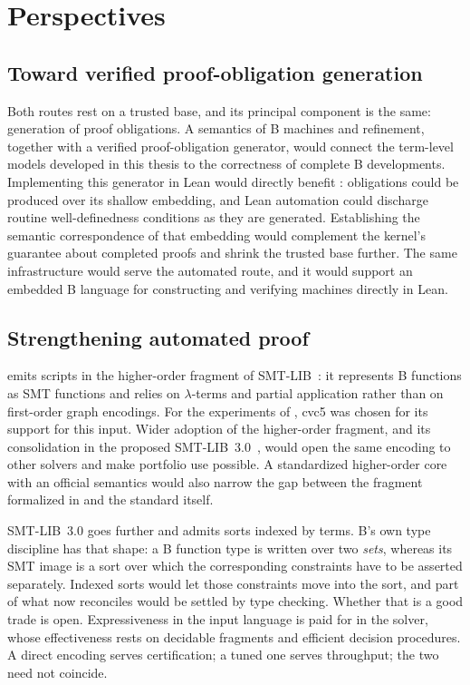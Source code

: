 \section{Perspectives}
\label{sec:future-work}

\subsection{Toward verified proof-obligation generation}

Both routes rest on a trusted base, and its principal component is the same: generation of proof obligations.
A semantics of B machines and refinement, together with a verified
proof-obligation generator, would connect the term-level models developed in
this thesis to the correctness of complete B developments. Implementing this
generator in Lean would directly benefit \barrel{}: obligations could be produced
over its shallow embedding, and Lean automation could discharge routine
well-definedness conditions as they are generated. Establishing the semantic
correspondence of that embedding would complement the kernel's guarantee about
completed proofs and shrink the trusted base further. The same infrastructure
would serve the automated route, and it would support an embedded B language for
constructing and verifying machines directly in Lean.

\subsection{Strengthening automated proof}

\beer{} emits scripts in the higher-order fragment of
SMT-LIB~\cite{smtlib2.7}: it represents B functions as SMT functions and relies
on \(\lambda\)-terms and partial application rather than on first-order graph
encodings. For the experiments of , cvc5 was chosen for its support
for this input. Wider adoption of the higher-order
fragment, and its consolidation in the proposed
SMT-LIB~3.0~\cite{smtlib3proposal}, would open the same encoding to other solvers
and make portfolio use possible. A standardized higher-order core with an
official semantics would also narrow the gap between the fragment formalized in
 and the standard itself.

SMT-LIB~3.0 goes further and admits sorts indexed by terms. B's own type
discipline has that shape: a B function type is written over two \emph{sets},
whereas its SMT image is a sort over which the corresponding constraints have to
be asserted separately. Indexed sorts would let those constraints move into the
sort, and part of what  now reconciles would be settled by
type checking. Whether that is a good trade is open. Expressiveness in the input
language is paid for in the solver, whose effectiveness rests on decidable
fragments and efficient decision procedures.
A direct encoding serves certification; a tuned one serves throughput;
the two need not coincide.

